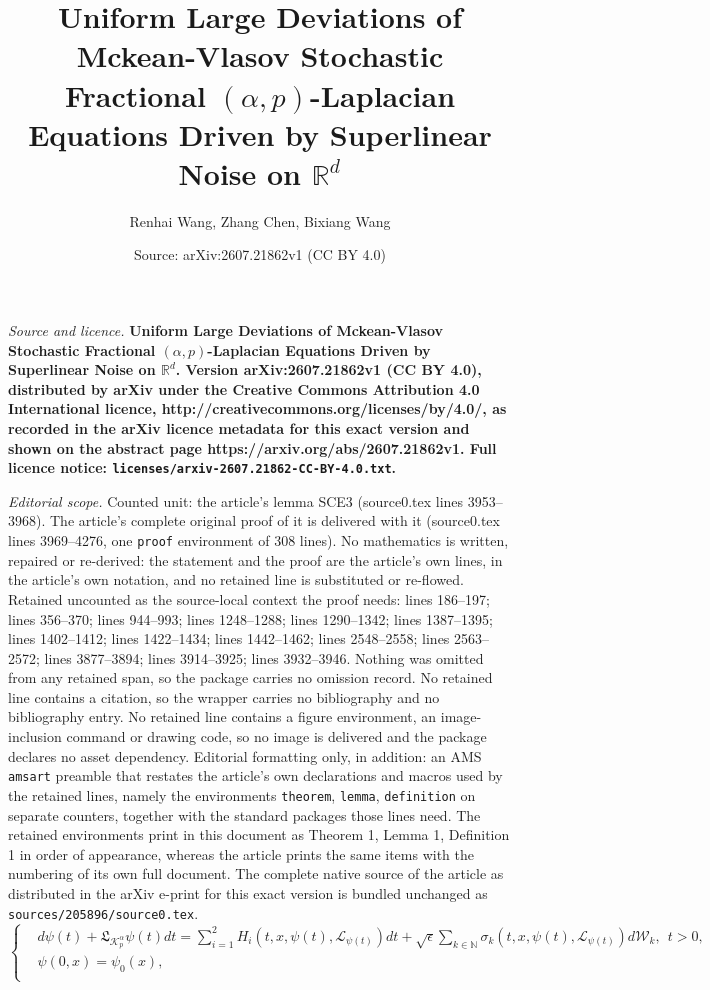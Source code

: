 \documentclass[10pt,a4paper]{amsart}
\title{\bf Uniform Large Deviations of Mckean-Vlasov Stochastic Fractional $(\alpha,p)$-Laplacian Equations Driven by Superlinear Noise on $\mathbb{R}^d$}
\author{Renhai Wang, Zhang Chen, Bixiang Wang}
\date{Source: arXiv:2607.21862v1 (CC BY 4.0)}
\begin{document}
\maketitle

\noindent\emph{Source and licence.} \bf Uniform Large Deviations of Mckean-Vlasov Stochastic Fractional $(\alpha,p)$-Laplacian Equations Driven by Superlinear Noise on $\mathbb{R}^d$. Version arXiv:2607.21862v1 (CC BY 4.0), distributed by arXiv under the Creative Commons Attribution 4.0 International licence, http://creativecommons.org/licenses/by/4.0/, as recorded in the arXiv licence metadata for this exact version and shown on the abstract page https://arxiv.org/abs/2607.21862v1. Full licence notice: \texttt{licenses/arxiv-2607.21862-CC-BY-4.0.txt}.\par\smallskip

\noindent\textit{Editorial scope.} Counted unit: the article's lemma SCE3 (source0.tex lines 3953--3968). The article's complete original proof of it is delivered with it (source0.tex lines 3969--4276, one \texttt{proof} environment of 308 lines). No mathematics is written, repaired or re-derived: the statement and the proof are the article's own lines, in the article's own notation, and no retained line is substituted or re-flowed.  Retained uncounted as the source-local context the proof needs: lines 186--197; lines 356--370; lines 944--993; lines 1248--1288; lines 1290--1342; lines 1387--1395; lines 1402--1412; lines 1422--1434; lines 1442--1462; lines 2548--2558; lines 2563--2572; lines 3877--3894; lines 3914--3925; lines 3932--3946.  Nothing was omitted from any retained span, so the package carries no omission record.  No retained line contains a citation, so the wrapper carries no bibliography and no bibliography entry.  No retained line contains a figure environment, an image-inclusion command or drawing code, so no image is delivered and the package declares no asset dependency.  Editorial formatting only, in addition: an AMS \texttt{amsart} preamble that restates the article's own declarations and macros used by the retained lines, namely the environments \texttt{theorem}, \texttt{lemma}, \texttt{definition} on separate counters, together with the standard packages those lines need.  The retained environments print in this document as Theorem 1, Lemma 1, Definition 1 in order of appearance, whereas the article prints the same items with the numbering of its own full document.  The complete native source of the article as distributed in the arXiv e-print for this exact version is bundled unchanged as \texttt{sources/205896/source0.tex}.
\begin{equation}\label{Int19-}
\left\{
  \begin{aligned}
  &d \psi(t)+ \mathfrak{L}_{\mathcal{K}_{p}^\alpha} \psi(t) dt
=\sum_{i=1}^2H_i(t,x,\psi(t),\mathcal{L}_{
\psi(t)})dt
+ \sqrt{\epsilon}\sum_{k\in\mathbb{N}} \sigma_{k}(t,x,\psi(t),\mathcal{L}_{
\psi(t)}) d\mathcal{W}_k, \ \ t>0, \\
  &\psi(0,x)=\psi_0(x),\\
  \end{aligned}
\right.
\end{equation}
\end{document}
